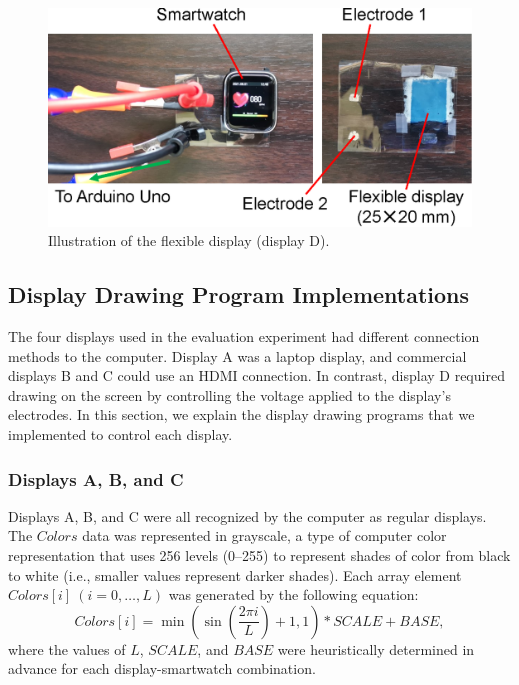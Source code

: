 \documentclass{ieeeaccess}
\begin{document}
\begin{figure}[!t]
  \centering
  \includegraphics[width=1\linewidth]{figures/flexible.eps}
  \caption{Illustration of the flexible display (display D).}
  \label{fig:flexible}
\end{figure}


\subsection{Display Drawing Program Implementations}
The four displays used in the evaluation experiment had different connection methods to the computer. Display A was a laptop display, and commercial displays B and C could use an HDMI connection. In contrast, display D required drawing on the screen by controlling the voltage applied to the display's electrodes. In this section, we explain the display drawing programs that we implemented to control each display.

\subsubsection{Displays A, B, and C}
Displays A, B, and C were all recognized by the computer as regular displays. The $Colors$ data was represented in grayscale, a type of computer color representation that uses 256 levels (0--255) to represent shades of color from black to white (i.e., smaller values represent darker shades). Each array element $Colors[i]~(i=0,\dots,L)$ was generated by the following equation:
\begin{equation}
  Colors[i]=\min\left(\sin\left(\frac{2\pi i}{L}\right)+1,1\right)*SCALE+BASE,
\end{equation}
where the values of $L$, $SCALE$, and $BASE$ were heuristically determined in advance for each display-smartwatch combination.\par
\end{document}
